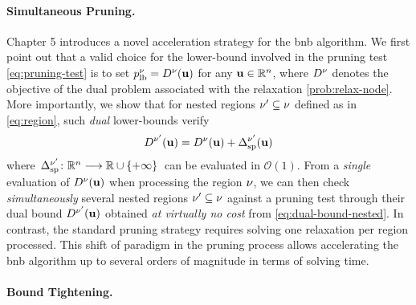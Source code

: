 \documentclass[11pt]{article}
\begin{document}
\paragraph{Simultaneous Pruning.}

Chapter 5 introduces a novel acceleration strategy for the \gls{bnb} algorithm.
We first point out that a valid choice for the lower-bound involved in the pruning test \eqref{eq:pruning-test} is to set $p_{\text{lb}}^\nu = D^\nu(\mathbf{u})$ for any $\dv \in \kR^{\pdim}$, where $D^\nu$ denotes the objective of the dual problem associated with the relaxation \eqref{prob:relax-node}.
More importantly, we show that for nested regions $\nu' \subseteq \nu$ defined as in \eqref{eq:region}, such \emph{dual} lower-bounds verify
\begin{equation}
    \label{eq:dual-bound-nested}
    D^{\nu'}(\mathbf{u}) = D^\nu(\mathbf{u}) + \Delta_{\text{sp}}^{\nu'}(\mathbf{u})
\end{equation}
where $\kfuncdef{\Delta_{\text{sp}}^{\nodesymbol'}}{\kR^{\pdim}}{\kR \cup \{+\infty\}}$ can be evaluated in $\mathcal{O}(1)$.
From a \emph{single} evaluation of $D^\nu(\mathbf{u})$ when processing the region $\nu$, we can then check \emph{simultaneously} several nested regions $\nu' \subseteq \nu$ against a pruning test through their dual bound $D^{\nu'}(\mathbf{u})$ obtained \emph{at virtually no cost} from \eqref{eq:dual-bound-nested}.
In contrast, the standard pruning strategy requires solving one relaxation per region processed.
This shift of paradigm in the pruning process allows accelerating the \gls{bnb} algorithm up to several orders of magnitude in terms of solving time.

\paragraph{Bound Tightening.}
\end{document}
